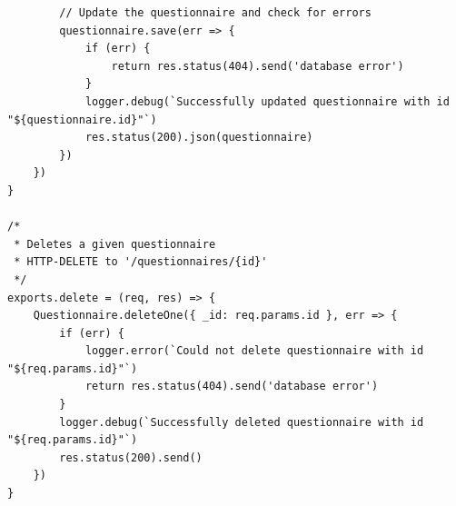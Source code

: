 \begin{verbatim}
        // Update the questionnaire and check for errors
        questionnaire.save(err => {
            if (err) {
                return res.status(404).send('database error')
            }
            logger.debug(`Successfully updated questionnaire with id "${questionnaire.id}"`)
            res.status(200).json(questionnaire)
        })
    })
}

/*
 * Deletes a given questionnaire
 * HTTP-DELETE to '/questionnaires/{id}'
 */
exports.delete = (req, res) => {
    Questionnaire.deleteOne({ _id: req.params.id }, err => {
        if (err) {
            logger.error(`Could not delete questionnaire with id "${req.params.id}"`)
            return res.status(404).send('database error')
        }
        logger.debug(`Successfully deleted questionnaire with id "${req.params.id}"`)
        res.status(200).send()
    })
}
\end{verbatim}